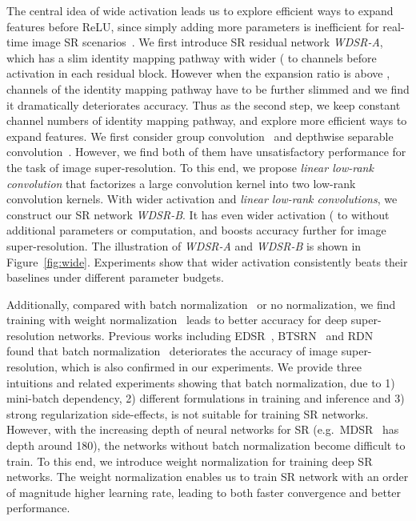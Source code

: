 \documentclass{article}
\begin{document}
The central idea of wide activation leads us to explore efficient ways to expand features before ReLU, since simply adding more parameters is inefficient for real-time image SR scenarios~\cite{goto2014super}. We first introduce SR residual network \textit{WDSR-A}, which has a slim identity mapping pathway with wider ( to  channels before activation in each residual block. However when the expansion ratio is above , channels of the identity mapping pathway have to be further slimmed and we find it dramatically deteriorates accuracy. Thus as the second step, we keep constant channel numbers of identity mapping pathway, and explore more efficient ways to expand features. We first consider group convolution~\cite{xie2017aggregated} and depthwise separable convolution~\cite{chollet2016xception}. However, we find both of them have unsatisfactory performance for the task of image super-resolution. To this end, we propose \textit{linear low-rank convolution} that factorizes a large convolution kernel into two low-rank convolution kernels. With wider activation and \textit{linear low-rank convolutions}, we construct our SR network \textit{WDSR-B}. It has even wider activation ( to  without additional parameters or computation, and boosts accuracy further for image super-resolution. The illustration of \textit{WDSR-A} and \textit{WDSR-B} is shown in Figure~\ref{fig:wide}. Experiments show that wider activation consistently beats their baselines under different parameter budgets.

Additionally, compared with batch normalization~\cite{ioffe2015batch} or no normalization, we find training with weight normalization~\cite{salimans2016weight} leads to better accuracy for deep super-resolution networks. Previous works including EDSR~\cite{lim2017enhanced}, BTSRN~\cite{fan2017balanced} and RDN~\cite{2018arXiv180208797Z} found that batch normalization~\cite{ioffe2015batch} deteriorates the accuracy of image super-resolution, which is also confirmed in our experiments. We provide three intuitions and related experiments showing that batch normalization, due to 1) mini-batch dependency, 2) different formulations in training and inference and 3) strong regularization side-effects, is not suitable for training SR networks. However, with the increasing depth of neural networks for SR (e.g.\ MDSR~\cite{lim2017enhanced} has depth around 180), the networks without batch normalization become difficult to train. To this end, we introduce weight normalization for training deep SR networks. The weight normalization enables us to train SR network with an order of magnitude higher learning rate, leading to both faster convergence and better performance.
\end{document}

